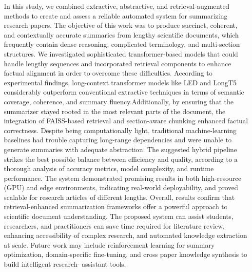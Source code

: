\documentclass[conference]{IEEEtran}
\begin{document}
In this study, we combined extractive, abstractive, and retrieval-augmented methods to create and assess a reliable automated system for summarizing research papers. The objective of this work was to produce succinct, coherent, and contextually accurate summaries from lengthy scientific documents, which frequently contain dense reasoning, complicated terminology, and multi-section structures. We investigated sophisticated transformer-based models that could handle lengthy sequences and incorporated retrieval components to enhance factual alignment in order to overcome these difficulties.
According to experimental findings, long-context transformer models like LED and LongT5 considerably outperform conventional extractive techniques in terms of semantic coverage, coherence, and summary fluency.Additionally, by ensuring that the summarizer stayed rooted in the most relevant parts of the document, the integration of FAISS-based retrieval and section-aware chunking enhanced factual correctness. Despite being computationally light, traditional machine-learning baselines had trouble capturing long-range dependencies and were unable to generate summaries with adequate abstraction.
The suggested hybrid pipeline strikes the best possible balance between efficiency and quality, according to a thorough analysis of accuracy metrics, model complexity, and runtime performance. The system demonstrated promising results in both high-resource (GPU) and edge environments, indicating real-world deployability, and proved scalable for research articles of different lengths.
Overall, results confirm that retrieval-enhanced summarization frameworks offer a powerful approach to scientific document understanding. The proposed system can assist students, researchers, and practitioners can save time required for literature review, enhancing accessibility of complex research, and automated knowledge extraction at scale. Future work may include reinforcement learning for summary optimization, domain-specific fine-tuning, and cross paper knowledge synthesis to build intelligent research-
assistant tools.
\end{document}
